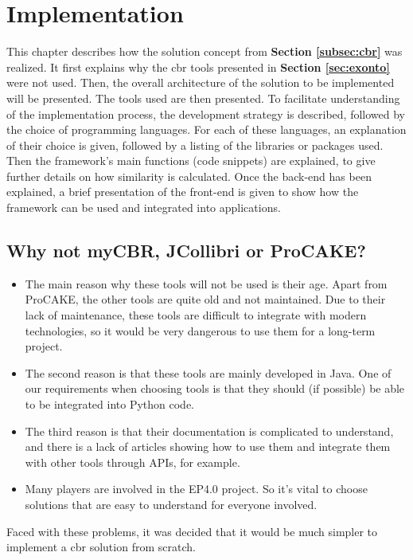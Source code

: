 \section{Implementation\label{sec:implementation}}
This chapter describes how the solution concept from \textbf{Section \ref{subsec:cbr}} was realized. It first explains why the \acrshort{cbr} tools presented in \textbf{Section \ref{sec:exonto}} were not used. Then, the overall architecture of the solution to be implemented will be presented. The tools used are then presented. To facilitate understanding of the implementation process, the development strategy is described, followed by the choice of programming languages. For each of these languages, an explanation of their choice is given, followed by a listing of the libraries or packages used. Then the framework's main functions (code snippets) are explained, to give further details on how similarity is calculated. Once the back-end has been explained, a brief presentation of the front-end is given to show how the framework can be used and integrated into applications.

\subsection{Why not myCBR, JCollibri or ProCAKE?\label{sec:whyNot}}
\begin{itemize}
    \item The main reason why these tools will not be used is their age. Apart from ProCAKE, the other tools are quite old and not maintained. Due to their lack of maintenance, these tools are difficult to integrate with modern technologies, so it would be very dangerous to use them for a long-term project. 
    \item The second reason is that these tools are mainly developed in Java. One of our requirements when choosing tools is that they should (if possible) be able to be integrated into Python code.
    \item The third reason is that their documentation is complicated to understand, and there is a lack of articles showing how to use them and integrate them with other tools through APIs, for example. 
    \item Many players are involved in the EP4.0 project. So it's vital to choose solutions that are easy to understand for everyone involved.\\
\end{itemize}
Faced with these problems, it was decided that it would be much simpler to implement a \acrshort{cbr} solution from scratch.


